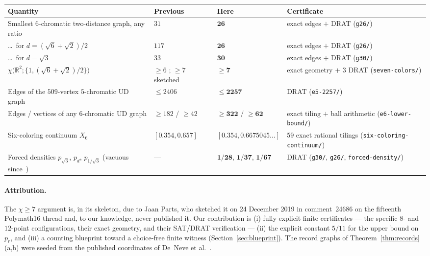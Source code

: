 \documentclass[11pt]{article}
\theoremstyle{definition}
\theoremstyle{remark}
\newcommand{\R}{\mathbb{R}}
\newcommand{\dd}{d}                          %
\newcommand{\chid}[1]{\chi\bigl(\R^2;#1\bigr)}
\begin{document}
\begin{center}
\small
\begin{tabular}{@{}p{4.9cm}p{2.8cm}lp{3.5cm}@{}}
\toprule
Quantity & Previous & Here & Certificate \\
\midrule
Smallest $6$-chromatic two-distance graph, any ratio &
$31$ \cite{Parts20a} & $\mathbf{26}$ & exact edges $+$ DRAT
(\texttt{g26/}) \\
\dots\ for $\dd=(\sqrt6+\sqrt2)/2$ &
$117$ \cite{DeNeve25} & $\mathbf{26}$ & exact edges $+$ DRAT
(\texttt{g26/}) \\
\dots\ for $\dd=\sqrt3$ &
$33$ \cite{DeNeve25} & $\mathbf{30}$ & exact edges $+$ DRAT
(\texttt{g30/}) \\
$\chid{\{1,(\sqrt6+\sqrt2)/2\}}$ &
$\ge 6$ \cite{PalvolgyiAgoston19,DeNeve25}; $\ge 7$ sketched
\cite{Parts19} &
$\mathbf{\ge 7}$ & exact geometry $+$ 3 DRAT
(\texttt{seven-colors/}) \\
Edges of the $509$-vertex $5$-chromatic UD graph &
$\le 2406$ \cite{deGreyParts22} & $\mathbf{\le 2257}$ & DRAT
(\texttt{e5-2257/}) \\
Edges / vertices of any $6$-chromatic UD graph &
$\ge 182$ / $\ge 42$ \cite{deGreyParts22} & $\mathbf{\ge 322}$ / $\mathbf{\ge 62}$ &
exact tiling $+$ ball arithmetic (\texttt{e6-lower-bound/}) \\
Six-coloring continuum $X_6$ &
$[0.354,0.657]$ \cite{MPSZ} & $[0.354,\mathbf{0.6675045}\dots]$ &
59 exact rational tilings (\texttt{six-coloring-}\linebreak[0]\texttt{continuum/}) \\
Forced densities $p_{\sqrt3}$, $p_{\dd}$, $p_{1/\sqrt3}$ (vacuous
since~\cite{OAI}) &
--- & $\mathbf{1/28}$, $\mathbf{1/37}$, $\mathbf{1/67}$ & DRAT
(\texttt{g30/}, \texttt{g26/}, \texttt{forced-density/}) \\
\bottomrule
\end{tabular}
\end{center}

\paragraph{Attribution.}
The $\chi\ge7$ argument is, in its skeleton, due to Jaan Parts, who
sketched it on 24 December 2019 in comment~24686 on the fifteenth
Polymath16 thread \cite{Parts19} and, to our knowledge, never published
it.  Our contribution is (i) fully explicit finite certificates --- the
specific $8$- and $12$-point configurations, their exact geometry, and
their SAT/DRAT verification --- (ii) the explicit constant $5/11$ for
the upper bound on $p_r$, and (iii) a counting blueprint toward a
choice-free finite witness (Section~\ref{sec:blueprint}).  The record
graphs of Theorem~\ref{thm:records}(a,b) were seeded from the published
coordinates of De~Neve et al.\ \cite{DeNeve25}.
\end{document}
